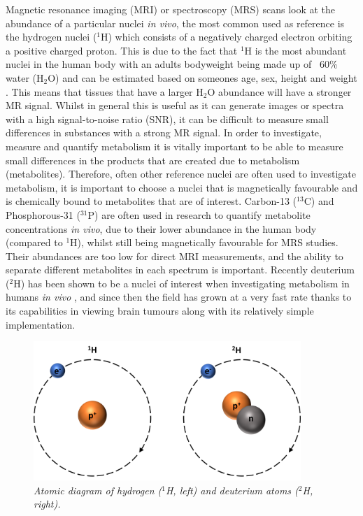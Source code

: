 \documentclass[class=article, crop=false]{standalone}
\begin{document}
 
\label{Chap:Introduction}

Magnetic resonance imaging (MRI) or spectroscopy (MRS) scans look at the abundance of a particular nuclei \textit{in vivo}, the most common used as reference is the hydrogen nuclei ($^1$H) which consists of a negatively charged electron orbiting a positive charged proton. This is due to the fact that $^1$H is the most abundant nuclei in the human body with an adults bodyweight being made up of ~60\% water (H$_2$O) and can be estimated based on someones age, sex, height and weight \cite{Watson1980TotalMeasurements}. This means that tissues that have a larger H$_2$O abundance will have a stronger MR signal. Whilst in general this is useful as it can generate images or spectra with a high signal-to-noise ratio (SNR), it can be difficult to measure small differences in substances with a strong MR signal. In order to investigate, measure and quantify metabolism it is vitally important to be able to measure small differences in the products that are created due to metabolism (metabolites). Therefore, often other reference nuclei are often used to investigate metabolism, it is important to choose a nuclei that is magnetically favourable and is chemically bound to metabolites that are of interest. Carbon-13 ($^{13}$C) \cite{Grist2019QuantifyingImaging,Brender2019DynamicHyperpolarization} and Phosphorous-31 ($^{31}$P) \cite{Gordon1980LocalizationResonance} are often used in research to quantify metabolite concentrations \textit{in vivo}, due to their lower abundance in the human body (compared to $^1$H), whilst still being magnetically favourable for MRS studies. Their abundances are too low for direct MRI measurements, and the ability to separate different metabolites in each spectrum is important. Recently deuterium ($^2$H) has been shown to be a nuclei of interest when investigating metabolism in humans \textit{in vivo} \cite{Lu2017QuantitativeSpectroscopy,DeFeyter2018DeuteriumVivo}, and since then the field has grown at a very fast rate thanks to its capabilities in viewing brain tumours \cite{DeFeyter2018DeuteriumVivo} along with its relatively simple implementation.

\begin{figure}
    \centering
    \includegraphics[width=0.9\textwidth]{Figures/Intro/1H2H.png}
    \caption{\textit{Atomic diagram of hydrogen ($^1$H, left) and deuterium atoms ($^2$H, right).}}
    \label{fig:intro:1H2H}
\end{figure}
\end{document}
